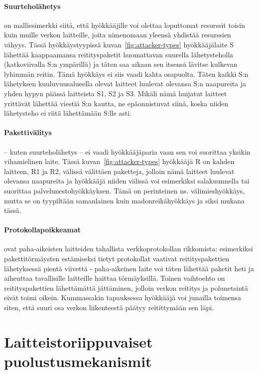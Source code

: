 \documentclass[finnish]{tktltiki2}
\theoremstyle{definition}
\theoremstyle{remark}
\begin{document}
\paragraph{Suurteholähetys} on malliesimerkki siitä, että hyökkääjille voi olettaa loputtomat resurssit toisin kuin muille verkon laitteille, joita nimenomaan yleensä yhdistää resurssien vähyys. Tässä hyökkäystyypissä kuvan~\ref{fig:attacker-types} hyökkääjälaite S lähettää kaappaamansa reitityspaketit huomattavan suurella lähetysteholla (katkoviivalla S:n ympärillä) ja täten saa aikaan sen itsensä lävitse kulkevan lyhimmän reitin. Tämä hyökkäys ei siis vaadi kahta osapuolta. Täten kaikki S:n lähetyksen kuuluvuusalueella olevat laitteet luulevat olevansa S:n naapureita ja yhden hypyn päässä laitteista S1, S2 ja S3. Mikäli nämä huijatut laitteet yrittävät lähettää viestiä S:n kautta, ne epäonnistuvat siinä, koska niiden lähetysteho ei riitä lähettämään S:lle asti.

\paragraph{Pakettivälitys} -- kuten suurteholähetys -- ei vaadi hyökkääjäparia vaan sen voi suorittaa yksikin vihamielinen laite. Tässä kuvan~\ref{fig:attacker-types} hyökkääjä R on kahden laitteen, R1 ja R2, välissä välittäen paketteja, jolloin nämä laitteet luulevat olevansa naapureita ja hyökkääjä niiden välissä voi esimerkiksi salakuunnella tai suorittaa palvelunestohyökkäyksen. Tämä on perinteinen ns. välimieshyökkäys, mutta se on tyypiltään samanlainen kuin madonreikähyökkäys ja siksi mukana tässä.

\paragraph{Protokollapoikkeamat} ovat paha-aikeisten laitteiden tahallista verkkoprotokollan rikkomista: esimerkiksi pakettitörmäysten estämiseksi tietyt protokollat vaativat reitityspakettien lähetyksessä pientä viivettä - paha-aikeinen laite voi täten lähettää paketit heti ja aiheuttaa tavallisille laitteille haittaa törmäyksillä. Toinen vaihtoehto on reitityspakettien lähettämättä jättäminen, jolloin verkon reititys ja polunetsintä eivät toimi oikein. Kummassakin tapauksessa hyökkääjä voi junailla toimensa siten, että suuri osa verkon liikenteestä päätyy reitittymään sen läpi.


\section{Laitteistoriippuvaiset puolustusmekanismit}
\end{document}
